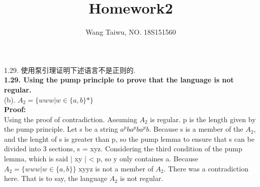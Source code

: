 \documentclass[a4paper, 11pt]{article}
\begin{document}
\title{Homework2}
\author{Wang Taiwu, NO. 18S151560}
\maketitle

1.29. 使用泵引理证明下述语言不是正则的.\\
\textbf{1.29. Using the pump principle to prove that the language is not regular.}
\\ (b). $A_2=\{www|w\in \{a, b\}*\}$
\\ \textbf{Proof:}
\\ \indent Using the proof of contradiction. Assuming $A_2$ is regular. p is the length given by the pump principle. Let s be a string $a^pba^pba^pb$. Because s is a member of the $A_2$, and the lenght of s is greater than p, so the pump lemma to ensure that s can be divided into 3 sections, s = xyz. Considering the third condition of the pump lemma, which is said | xy | < p, so y only containes a. Because $A_2=\{www|w\in\{a, b\}\}$ xyyz is not a member of $A_2$. There was a contradiction here. That is to say, the language $A_2$ is not regular.
\\
\end{document}
